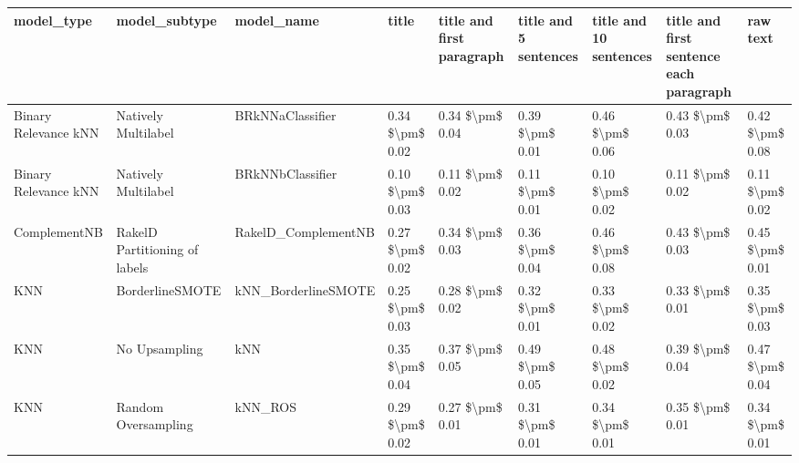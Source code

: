 \begin{tabular}{lllllllll}
\toprule
                     model\_type &                 model\_subtype &                                   model\_name &           title & title and first paragraph & title and 5 sentences & title and 10 sentences & title and first sentence each paragraph &            raw text \\
\midrule
           Binary Relevance kNN &           Natively Multilabel &                             BRkNNaClassifier & 0.34 \$\textbackslash pm\$ 0.02 &           0.34 \$\textbackslash pm\$ 0.04 &       0.39 \$\textbackslash pm\$ 0.01 &        0.46 \$\textbackslash pm\$ 0.06 &                         0.43 \$\textbackslash pm\$ 0.03 &     0.42 \$\textbackslash pm\$ 0.08 \\
           Binary Relevance kNN &           Natively Multilabel &                             BRkNNbClassifier & 0.10 \$\textbackslash pm\$ 0.03 &           0.11 \$\textbackslash pm\$ 0.02 &       0.11 \$\textbackslash pm\$ 0.01 &        0.10 \$\textbackslash pm\$ 0.02 &                         0.11 \$\textbackslash pm\$ 0.02 &     0.11 \$\textbackslash pm\$ 0.02 \\
                   ComplementNB & RakelD Partitioning of labels &                          RakelD\_ComplementNB & 0.27 \$\textbackslash pm\$ 0.02 &           0.34 \$\textbackslash pm\$ 0.03 &       0.36 \$\textbackslash pm\$ 0.04 &        0.46 \$\textbackslash pm\$ 0.08 &                         0.43 \$\textbackslash pm\$ 0.03 &     0.45 \$\textbackslash pm\$ 0.01 \\
                            KNN &               BorderlineSMOTE &                          kNN\_BorderlineSMOTE & 0.25 \$\textbackslash pm\$ 0.03 &           0.28 \$\textbackslash pm\$ 0.02 &       0.32 \$\textbackslash pm\$ 0.01 &        0.33 \$\textbackslash pm\$ 0.02 &                         0.33 \$\textbackslash pm\$ 0.01 &     0.35 \$\textbackslash pm\$ 0.03 \\
                            KNN &                 No Upsampling &                                          kNN & 0.35 \$\textbackslash pm\$ 0.04 &           0.37 \$\textbackslash pm\$ 0.05 &       0.49 \$\textbackslash pm\$ 0.05 &        0.48 \$\textbackslash pm\$ 0.02 &                         0.39 \$\textbackslash pm\$ 0.04 &     0.47 \$\textbackslash pm\$ 0.04 \\
                            KNN &           Random Oversampling &                                      kNN\_ROS & 0.29 \$\textbackslash pm\$ 0.02 &           0.27 \$\textbackslash pm\$ 0.01 &       0.31 \$\textbackslash pm\$ 0.01 &        0.34 \$\textbackslash pm\$ 0.01 &                         0.35 \$\textbackslash pm\$ 0.01 &     0.34 \$\textbackslash pm\$ 0.01 \\

\end{tabular}
